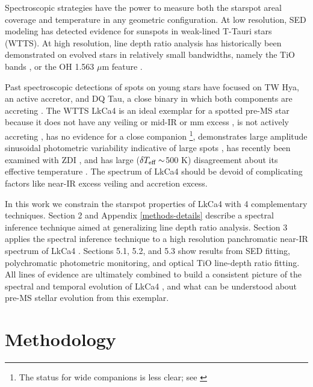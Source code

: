 \documentclass[twocolumn]{emulateapj}%
\newcommand{\name}{LkCa4 }
\begin{document}
Spectroscopic strategies have the power to measure both the starspot areal coverage and temperature in any geometric configuration.  At low resolution, SED modeling \citep{wolk96} has detected evidence for sunspots in weak-lined T-Tauri stars (WTTS).  At high resolution, line depth ratio analysis has historically been demonstrated on evolved stars in relatively small bandwidths, namely the TiO bands \citep{neff95,oneal96,oneal98,oneal04}, or the OH 1.563 $\mu$m feature \citep{oneal01}. 


Past spectroscopic detections of spots on young stars have focused on TW Hya, an active accretor, and DQ Tau, a close binary in which both components are accreting \citep{debes13,bary14}.  The WTTS \name \citep{herbig86,strom89a,downes88,strom89b} is an ideal exemplar for a spotted pre-MS star because it does not have any veiling \citep{hartigan95} or mid-IR or mm excess \citep{skrutskie90,andrews05,mccabe06,furlan06,luhman10,furlan11,harris12,marichalar12,howard13,buckle15}, is not actively accreting \citep{hartigan95,kenyon98,edwards06,cauley12,yang12,ardila13,castro13,loyd14,martinez15}, has no evidence for a close companion \citep{karr10,kraus11,daemgen15}\footnote{The status for wide companions is less clear; see \citet{stauffer91,itoh08,kraus09,kraus11}}, demonstrates large amplitude sinusoidal photometric variability indicative of large spots \citep{grankin08,xiao12}, has recently been examined with ZDI \citep{donati14}, and has large ($\delta T_\textrm{eff} \sim$500 K) disagreement about its effective temperature \citep{herczeg14}.  The spectrum of \name should be devoid of complicating factors like near-IR excess veiling and accretion excess.

In this work we constrain the starspot properties of \name with 4 complementary techniques.  Section 2 and Appendix \ref{methods-details} describe a spectral inference technique aimed at generalizing line depth ratio analysis.  Section 3 applies the spectral inference technique to a high resolution panchromatic near-IR spectrum of \name.  Sections 5.1, 5.2, and 5.3 show results from SED fitting, polychromatic photometric monitoring, and optical TiO line-depth ratio fitting.  All lines of evidence are ultimately combined to build a consistent picture of the spectral and temporal evolution of \name, and what can be understood about pre-MS stellar evolution from this exemplar.


\section{Methodology}\label{sec:methods} 
\end{document}
